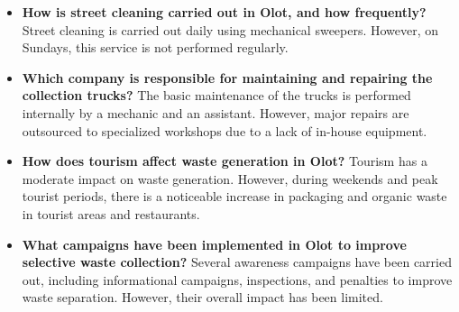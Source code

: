 \begin{itemize}
\item \textbf{How is street cleaning carried out in Olot, and how frequently?}
Street cleaning is carried out daily using mechanical sweepers. However, on Sundays, this service is not performed regularly.
\item \textbf{Which company is responsible for maintaining and repairing the collection trucks?}
The basic maintenance of the trucks is performed internally by a mechanic and an assistant. However, major repairs are outsourced to specialized workshops due to a lack of in-house equipment.
\item \textbf{How does tourism affect waste generation in Olot?}
Tourism has a moderate impact on waste generation. However, during weekends and peak tourist periods, there is a noticeable increase in packaging and organic waste in tourist areas and restaurants.
\item \textbf{What campaigns have been implemented in Olot to improve selective waste collection?}
Several awareness campaigns have been carried out, including informational campaigns, inspections, and penalties to improve waste separation. However, their overall impact has been limited.
\end{itemize}